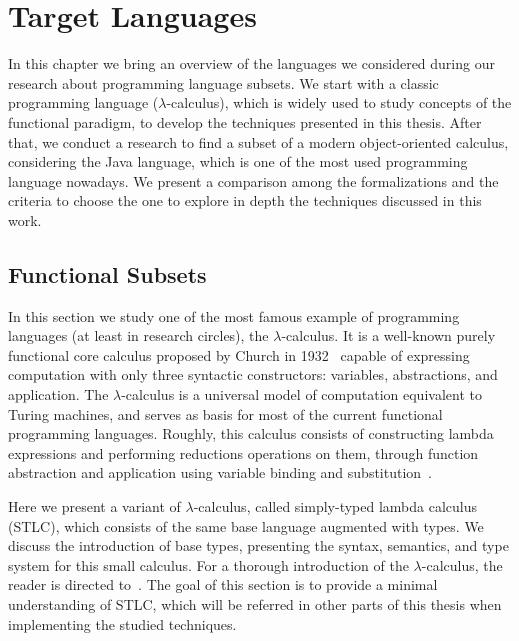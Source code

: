 \documentclass[tese,capa,english]{texufpel}
\begin{document}










\chapter{Target Languages}
\label{chap:target}

In this chapter we bring an overview of the languages we considered during our research about programming language subsets. We start with a classic programming language ($\lambda$-calculus), which is widely used to study concepts of the functional paradigm, to develop the techniques presented in this thesis. After that, we conduct a research to find a subset of a modern object-oriented calculus, considering the Java language, which is one of the most used programming language nowadays. We present a comparison among the formalizations and the criteria to choose the one to explore in depth the techniques discussed in this work.

\section{Functional Subsets}

In this section we study one of the most famous example of programming languages (at least in research circles), the $\lambda$-calculus. It is a well-known purely functional core calculus proposed by Church in 1932~\cite{Church32} capable of expressing computation with only three syntactic constructors: variables, abstractions, and application. The $\lambda$-calculus is a universal model of computation equivalent to Turing machines, and serves as basis for most of the current functional programming languages. Roughly, this calculus consists of constructing lambda expressions and performing reductions operations on them, through function abstraction and application using variable binding and substitution~\cite{Wadler-plfa}.

Here we present a variant of $\lambda$-calculus, called simply-typed lambda calculus (STLC), which consists of the same base language augmented with types. We discuss the introduction of base types, presenting the syntax, semantics, and type system for this small calculus. For a thorough introduction of the $\lambda$-calculus, the reader is directed to~\cite{Hindley:2008:LCI:1388400,Barendregt:1993:LCT:162552.162561}. The goal of this section is to provide a minimal understanding of STLC, which will be referred in other parts of this thesis when implementing the studied techniques.
\end{document}
